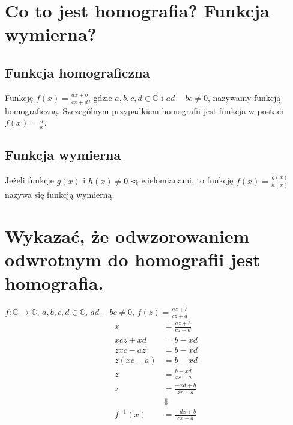 \documentclass{article}
\numberwithin{equation}{section}
\theoremstyle{definition}
\theoremstyle{case}
\renewcommand*{\C}{\mathbb{C}}
\DeclareMathOperator{\tg}{tg}
\DeclareMathOperator{\ctg}{ctg}
\begin{document}
\begin{multicols}{2}
\end{multicols}

\section{Co to jest homografia? Funkcja wymierna?}
\subsection{Funkcja homograficzna}
Funkcję $f(x) = \frac{ax+b}{cx+d}$, gdzie $a,b,c,d \in \C$ i $ad-bc \neq 0$, nazywamy funkcją homograficzną. Szczególnym przypadkiem homografii jest funkcja w postaci $f(x) = \frac{a}{x}$.

\subsection{Funkcja wymierna}
Jeżeli funkcje $g(x)$ i $h(x) \neq 0$ są wielomianami, to funkcję $f(x)=\frac{g(x)}{h(x)}$ nazywa się funkcją wymierną.

\section{Wykazać, że odwzorowaniem odwrotnym do homografii jest homografia.}
$f \colon \C \to \C$, $a,b,c,d \in \C$, $ad-bc \neq 0$, $f(z) = \frac{az+b}{cz+d}$
\begin{align*}
	x &= \frac{az+b}{cz+d}
	\\ xcz+xd &= b-xd
	\\ zxc-az &= b-xd
	\\ z(xc-a) &= b-xd
	\\ z &= \frac{b-xd}{xc-a}
	\\ z &= \frac{-xd+b}{xc-a}
	\\ &\Downarrow
	\\ f^{-1}(x) &= \frac{-dx+b}{cx-a}
\end{align*}
\end{document}
